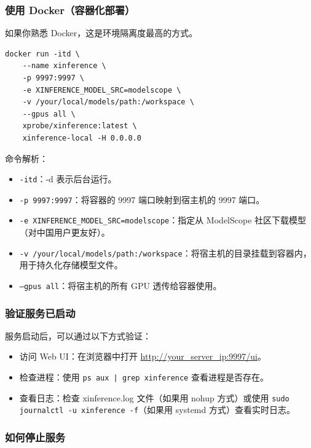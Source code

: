 \documentclass[12pt,UTF8]{ctexbook}
\begin{document}
\subsubsection{使用 Docker（容器化部署）}

如果你熟悉 Docker，这是环境隔离度最高的方式。

\begin{lstlisting}
docker run -itd \
    --name xinference \
    -p 9997:9997 \
    -e XINFERENCE_MODEL_SRC=modelscope \
    -v /your/local/models/path:/workspace \
    --gpus all \
    xprobe/xinference:latest \
    xinference-local -H 0.0.0.0
\end{lstlisting}

命令解析：

\begin{itemize}[leftmargin=2cm]
    \item \texttt{-itd}：-d 表示后台运行。
    \item \texttt{-p 9997:9997}：将容器的 9997 端口映射到宿主机的 9997 端口。
    \item \texttt{-e XINFERENCE\_MODEL\_SRC=modelscope}：指定从 ModelScope 社区下载模型（对中国用户更友好）。
    \item \texttt{-v /your/local/models/path:/workspace}：将宿主机的目录挂载到容器内，用于持久化存储模型文件。
    \item \texttt{--gpus all}：将宿主机的所有 GPU 透传给容器使用。
\end{itemize}

\subsubsection{验证服务已启动}

服务启动后，可以通过以下方式验证：

\begin{itemize}[leftmargin=2cm]
    \item 访问 Web UI：在浏览器中打开 \url{http://your_server_ip:9997/ui}。
    \item 检查进程：使用 \texttt{ps aux | grep xinference} 查看进程是否存在。
    \item 查看日志：检查 xinference.log 文件（如果用 nohup 方式）或使用 \texttt{sudo journalctl -u xinference -f}（如果用 systemd 方式）查看实时日志。
\end{itemize}

\subsubsection{如何停止服务}
\end{document}
